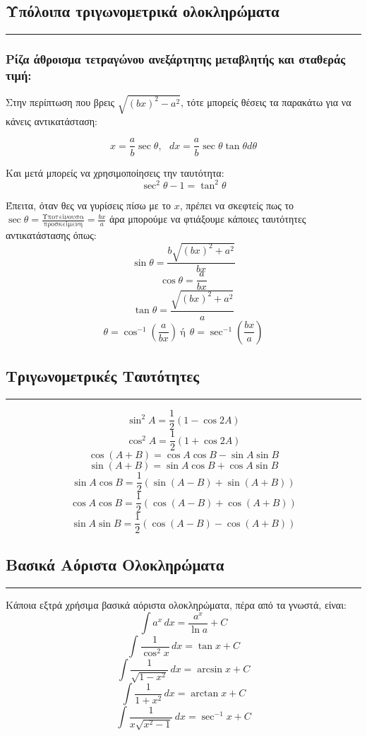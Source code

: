 \documentclass[a4paper,12pt]{article}
\begin{document}
\subsection*{Υπόλοιπα τριγωνομετρικά ολοκληρώματα}
\hrule
\vspace{0.5em}
\subsubsection*{Ρίζα άθροισμα τετραγώνου ανεξάρτητης μεταβλητής και σταθεράς τιμή:}
Στην περίπτωση που βρεις $\sqrt{(bx)^2 - a^2}$, τότε μπορείς θέσεις τα παρακάτω για να κάνεις αντικα\-τάσταση:

\[
x = \frac{a}{b} \sec \theta,\ \ \ dx = \frac{a}{b}\sec\theta\tan\theta d\theta
\]

Και μετά μπορείς να χρησιμοποίησεις την ταυτότητα:
\[
\sec^2 \theta - 1 = \tan^2\theta
\]

Έπειτα, όταν θες να γυρίσεις πίσω με το $x$, πρέπει να σκεφτείς πως το $\sec\theta = \frac{\text{Υποτείνουσα}}{\text{προσκείμενη}} = \frac{bx}{a}$
άρα μπορούμε να φτιάξουμε κάποιες ταυτότητες αντικατάστασης όπως:
\[
\sin\theta = \frac{b\sqrt{(bx)^2 + a^2}}{bx}
\]
\[
\cos\theta = \frac{a}{bx}
\]
\[
\tan\theta = \frac{\sqrt{(bx)^2 + a^2}}{a}
\]
\[
\theta = \cos^{-1}\left(\frac{a}{bx}\right) \ \text{ή}\ \ \theta = \sec^{-1}\left(\frac{bx}{a}\right) 
\]


\subsection*{Τριγωνομετρικές Ταυτότητες}
\hrule
\vspace{0.5em}
\[
\sin^2 A = \frac{1}{2}(1-\cos 2A)
\]
\[
\cos^2 A = \frac{1}{2}(1+\cos 2A)
\]
\[
\cos(A+B) = \cos A \cos B - \sin A \sin B
\]
\[
\sin(A+B) = \sin A \cos B + \cos A \sin B
\]
\[
\sin A \cos B = \frac{1}{2}(\sin(A-B) + \sin(A+B))
\]
\[
\cos A \cos B = \frac{1}{2}(\cos(A-B) + \cos(A+B))
\]
\[
\sin A \sin B = \frac{1}{2}(\cos(A-B) - \cos(A+B))
\]


\subsection*{Βασικά Αόριστα Ολοκληρώματα}
\hrule
\vspace{0.5em}
Κάποια εξτρά χρήσιμα βασικά αόριστα ολοκληρώματα, πέρα από τα γνωστά, είναι:
\[
\int a^x\,dx = \frac{a^x}{\ln a} + C
\]
\[
\int \frac{1}{\cos^2 x}\,dx = \tan x + C
\]
\[
\int \frac{1}{\sqrt{1-x^2}}\,dx = \arcsin x + C
\]
\[
\int \frac{1}{1+x^2}\,dx = \arctan x + C
\]
\[
\int \frac{1}{x\sqrt{x^2-1}}\,dx = \sec^{-1} x + C
\]
\end{document}
